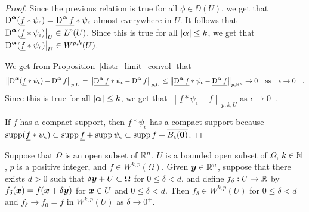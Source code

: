\begin{proof}
Since the previous relation is true for all $\phi \in \DD(U)$, we get that
$\displaystyle \operatorname{D}^{{\bm{\alpha}}}(\underline{f} \ast \psi_\epsilon)
= \underline{\operatorname{D}^{{\bm{\alpha}}} f} \ast \psi_\epsilon$ almost everywhere in
$U$.  It follows that
$\displaystyle \operatorname{D}^{{\bm{\alpha}}}(\underline{f} \ast
\psi_\epsilon)\big|_U \in L^p(U)$.
Since this is true for all $|{\bm{\alpha}}|\leq k$, we get that
$\displaystyle \operatorname{D}^{{\bm{\alpha}}}(\underline{f} \ast \psi_\epsilon)\big|_U
\in W^{p,k}(U)$.

We get from Proposition~\ref{distr_limit_convol} that
\[
\left\| \operatorname{D}^{{\bm{\alpha}}}(\underline{f} \ast \psi_\epsilon)
- \operatorname{D}^{{\bm{\alpha}}} f \right\|_{p,U}
= \left\| \underline{\operatorname{D}^{{\bm{\alpha}}} f} \ast \psi_\epsilon
- \operatorname{D}^{{\bm{\alpha}}} f \right\|_{p,U}
\leq \left\| \underline{\operatorname{D}^{{\bm{\alpha}}} f} \ast \psi_\epsilon -
\underline{\operatorname{D}^{{\bm{\alpha}}} f} \right\|_{p,\mathbb{R}^n} \to 0 \quad \text{as} \quad
\epsilon \to 0^+ \ .
\]
Since this is true for all $|{\bm{\alpha}}| \leq k$, we get that
$\displaystyle \left\| \underline{f} \ast \psi_\epsilon - f \right\|_{p,k,U}$
as $\epsilon \to 0^+$.

If $f$ has a compact support, then
$\displaystyle \underline{f} \ast \psi_\epsilon$ has a compact support
because
$\displaystyle \operatorname{supp} (\underline{f} \ast \psi_\epsilon)
\subset \operatorname{supp} \underline{f} + \operatorname{supp} \psi_\epsilon
\subset \operatorname{supp} f + \overline{B_\epsilon({\bm{0}})}$.
\end{proof}

\begin{lemma} \label{sob_denselem3}
Suppose that $\Omega$ is an open subset of $\displaystyle \mathbb{R}^n$,
$U$ is a bounded open subset of $\Omega$,
$k\in \mathbb{N}$, $p$ is a positive integer, and
$\displaystyle f \in W^{k,p}(\Omega)$.
Given $\displaystyle {\bm{y}} \in \mathbb{R}^n$, suppose that there exists
$d>0$ such that $\delta {\bm{y}} + U \subset \Omega$ for
$0 \leq \delta < d$, and
define $f_\delta:U \to \mathbb{R}$ by $f_\delta({\bm{x}}) = f({\bm{x}} + \delta {\bm{y}})$
for ${\bm{x}} \in U$ and $0 \leq \delta < d$.  Then
$\displaystyle f_\delta \in W^{k,p}(U)$ for $0 \leq \delta < d$ and
$f_\delta \to f_0 = f$ in $\displaystyle W^{k,p}(U)$ as $\delta \to 0^+$.
\end{lemma}

